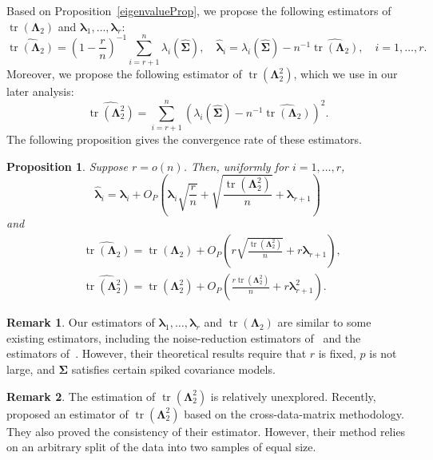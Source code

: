 \documentclass[12pt]{article} %
\DeclareMathOperator{\mytr}{tr}
\newcommand{\bZ}{\mathbf{Z}}
\newcommand{\bfsym}[1]{\ensuremath{\boldsymbol{#1}}}
\def\blambda {\bfsym {\lambda}}
\def\bLambda {\bfsym {\Lambda}}
\def\bSigma {\bfsym {\Sigma}}
\newtheorem{proposition}{Proposition}
\theoremstyle{definition}
\newtheorem{remark}{Remark}
\begin{document}
Based on Proposition~\ref{eigenvalueProp}, we propose the following estimators of  $\mytr(\bLambda_2)$ and $\blambda_1,\ldots,\blambda_r$:
\begin{equation*}
    \widehat{\mytr(\bLambda_2)}=\left(1-\frac{r}{n}\right)^{-1}\sum_{i=r+1}^n \lambda_i (\hat{\bSigma})
    ,\quad
    \hat{\blambda}_i=\lambda_i(\hat{\bSigma})-n^{-1}\widehat{\mytr(\bLambda_2)},\quad i=1,\ldots,r.
\end{equation*}
Moreover, we propose the following estimator of $\mytr(\bLambda_2^2)$, which we use in our later analysis:
\begin{equation*}
    \widehat{\mytr(\bLambda_2^2)}=\sum_{i=r+1}^n \left(\lambda_i(\hat{\bSigma})-n^{-1}\widehat{\mytr(\bLambda_2)}\right)^2.
\end{equation*}
The following proposition gives the convergence rate of these estimators.
\begin{proposition}
    \label{eigenvalueProp:R3}
    Suppose $r=o(n)$.
    Then, uniformly for $i=1,\ldots, r$, 
\begin{equation*}
    \hat{\blambda}_i
        =
        \blambda_i
        +O_P\left(\blambda_i \sqrt{\frac{r}{n}}+\sqrt{\frac{\mytr(\bLambda_2^2)}{ n}}+\blambda_{r+1}\right)
\end{equation*}
and
\begin{align*}
    &\widehat{\mytr(\bLambda_2)}=\mytr(\bLambda_2) + O_P\left(r\sqrt{\frac{\mytr(\bLambda_2^2)}{n}}+r\blambda_{r+1}\right),
        \\
&\widehat{\mytr(\bLambda_2^2)}
        =
         \mytr(\bLambda_2^2)
        +
        O_P\left(\frac{r \mytr(\bLambda_2^2)}{n} + r  \blambda_{r+1}^2\right).
\end{align*}
\end{proposition}
\begin{remark}
    Our estimators of $\blambda_1,\ldots, \blambda_r$ and $\mytr(\bLambda_2)$ are similar to some existing estimators, including the noise-reduction estimators of~\cite{YATA2012193} and the estimators of~\cite{wang2017As}.
    However, their theoretical results require that $r$ is fixed, $p$ is not large, and $\bSigma$ satisfies certain spiked covariance models.
\end{remark}

\begin{remark}
    The estimation of $\mytr(\bLambda_2^2)$ is relatively unexplored.
    Recently, \cite{Aoshima2018} proposed an estimator of $\mytr(\bLambda_2^2)$ based on the cross-data-matrix methodology.
    They also proved the consistency of their estimator.
    However, their method relies on an arbitrary split of the data into two samples of equal size.
\end{remark}
\end{document}
